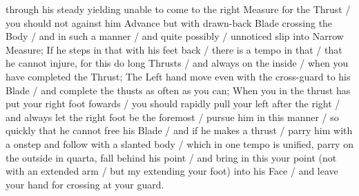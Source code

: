 \newpage


\newpage



through his steady yielding unable to come to the right Measure for
the Thrust / you should not against him Advance but with drawn-back
Blade crossing the Body / and in such a manner / and quite
possibly / unnoticed slip into Narrow Measure; If he steps in that
with his feet back / there is a tempo in that / that he cannot injure,
for this do long Thrusts / and always on the inside / when you have
completed the Thrust; The Left hand move even with the cross-guard to
his Blade / and complete the thusts as often as you can; When you in
the thrust has put your right foot fowards / you should rapidly pull
your left after the right / and always let the right foot be the
foremost / pursue him in this manner / so quickly that he cannot free
his Blade / and if he makes a thrust / parry him with a onstep and
follow with a slanted body / which in one tempo is unified, parry on
the outside in quarta, fall behind his point / and bring in this your
point (not with an extended arm / but my extending your foot) into his
Face / and leave your hand for crossing at your guard.


